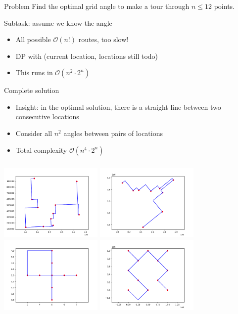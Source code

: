 \begin{frame}
    \frametitle{\problemtitle}
    \begin{block}{Problem}
        Find the optimal grid angle to make a tour through $n \leq 12$ points.
    \end{block}
    \pause
    \begin{block}{Subtask: assume we know the angle}
      \begin{itemize}
      \item All possible $\mathcal O(n!)$ routes, too slow!
      \item DP with (current location, locations still todo)
      \item This runs in $\mathcal O(n^2 \cdot 2^n)$
      \end{itemize}
    \end{block}
    \pause
    \begin{block}{Complete solution}
      \begin{itemize}
      \item Insight: in the optimal solution, there is a straight line between two consecutive locations
      \item Consider all $n^2$ angles between pairs of locations
      \item Total complexity $\mathcal O(n^4 \cdot 2^n)$
      \end{itemize}
    \end{block}
    \pause
    \solvestats
\end{frame}

\begin{frame}
  \frametitle{\problemtitle}
  \begin{center}
    \includegraphics[width=5cm]{02-random}
    \includegraphics[width=5cm]{12-random}
    \includegraphics[width=5cm]{57-plus}
    \includegraphics[width=5cm]{63-maximal}
  \end{center}
\end{frame}
